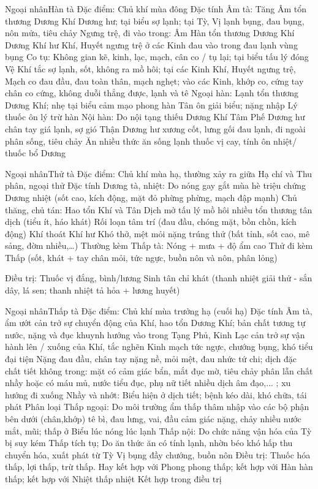 \documentclass[
	11pt, %
]{beamer}
\theoremstyle{newblock}
\begin{document}
\begin{frame}{Ngoại nhân}{Hàn tà}
	Đặc điểm: Chủ khí mùa đông
Đặc tính
Âm tà: Tăng Âm   tổn thương Dương Khí   Dương hư; tại biểu   sợ lạnh; tại Tỳ, Vị
  lạnh bụng, đau bụng, nôn mửa, tiêu chảy
Ngưng trệ, đi vào trong: Âm Hàn   tổn thương Dương Khí   Dương Khí hư   Khí, Huyết ngưng trệ ở các Kinh   đau   vào trong   đau lạnh vùng bụng
Co tụ: Không gian kẽ, kinh, lạc, mạch, cân co / tụ lại; tại biểu   tấu lý đóng   Vệ Khí tắc
  sợ lạnh, sốt, không ra mồ hôi; tại các Kinh   Khí, Huyết ngưng trệ, Mạch co   đau đầu, đau toàn thân, mạch nghẹt; vào các Kinh, khớp   co, cứng   tay chân co cứng, không duỗi thẳng được, lạnh và tê
Ngoại  hàn:  Lạnh     tổn  thương Dương  Khí;  nhẹ     tại  biểu    cảm mạo phong hàn Tân ôn  giải biểu; nặng   nhập Lý thuốc ôn lý trừ hàn
Nội hàn: Do nội tạng thiếu Dương Khí
Tâm Phế Dương hư   chân tay giá lạnh, sợ gió
Thận Dương hư   xương cốt, lưng gối đau lạnh, đi ngoài phân sống, tiêu chảy
Ăn nhiều thức ăn sống lạnh
thuốc vị cay, tính ôn nhiệt/ thuốc bổ Dương
\end{frame}
\begin{frame}{Ngoại nhân}{Thử tà}
	Đặc điểm: Chủ khí mùa hạ, thường xảy ra giữa Hạ chí và Thu phân, ngoại thử
Đặc tính
Dương tà, nhiệt: Do nóng gay gắt mùa hè triệu chứng Dương nhiệt (sốt cao, kích động, mặt đỏ phừng phừng, mạch đập mạnh)
Chủ thăng, chủ tán:
Hao tổn Khí và Tân Dịch mở tấu lý mồ hôi nhiều tổn thương tân dịch (tiểu ít, háo khát)
Rối loạn tâm trí (đau đầu, chóng mặt, bồn chồn, kích động)
Khí thoát Khí hư Khó thở, mệt mỏi nặng  trúng thử (bất tỉnh, sốt cao, mê sảng, đờm nhiều,…)
Thường kèm Thấp tà: Nóng + mưa + độ ẩm cao Thử đi kèm Thấp (sốt, khát + tay chân mỏi, tức ngực, buồn nôn và nôn, phân lỏng) 

Điều trị:
Thuốc vị đắng, bình/lương
Sinh tân chỉ khát (thanh nhiệt giải thử - sắn dây, lá sen; thanh nhiệt tả hỏa + lương huyết)


\end{frame}
\begin{frame}{Ngoại nhân}{Thấp tà}
	Đặc điểm: Chủ khí mùa trưởng hạ (cuối hạ)
Đặc tính
Âm tà, ẩm ướt  cản trở sự chuyển động của Khí, hao tổn Dương Khí; bản chất tương tự nước, nặng và đục  khuynh hướng vào trong Tạng Phủ, Kinh Lạc  cản trở sự vận hành lên / xuống của Khí, tắc nghẽn Kinh mạch  tức ngực, chướng bụng, khó tiểu  đại tiện
Nặng  đau đầu, chân tay nặng nề, mỏi mệt, đau nhức tứ chi; dịch đặc  chất tiết không trong: mặt có cảm giác bẩn, mắt đục mờ, tiêu chảy phân lẫn chất nhầy hoặc có máu mủ, nước tiểu đục, phụ nữ tiết nhiều dịch âm đạo,... ; xu hướng đi xuống
Nhầy và nhớt: Biểu hiện ở dịch tiết; bệnh kéo dài, khó chữa, tái phát
Phân loại
Thấp ngoại: Do môi trường ẩm thấp  thâm nhập vào các bộ phận bên dưới (chân,khớp)  tê bì, đau lưng, vai, đầu cảm giác nặng, chảy nhiều nước mắt, mũi; thấp ở Biểu lúc nóng lúc lạnh
Thấp nội: Do chức năng vận hóa của Tỳ bị suy kém Thấp tích tụ; Do ăn thức ăn có tính lạnh, nhờn béo    khó  hấp  thu  chuyển  hóa, xuất  phát  từ  Tỳ  Vị    bụng  đầy chướng, buồn nôn
	Điều trị: Thuốc hóa thấp, lợi thấp, trừ thấp. Hay kết hợp với Phong  phong thấp; kết hợp với Hàn  hàn thấp; kết hợp với Nhiệt  thấp nhiệt Kết hợp trong điều trị
\end{frame}
\end{document}
